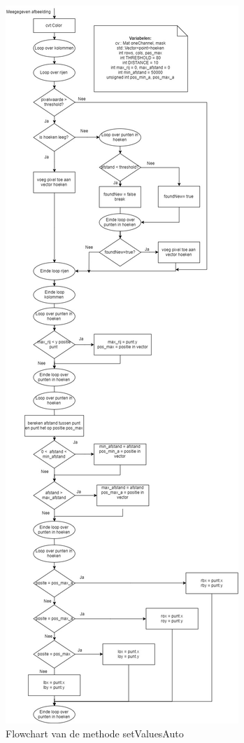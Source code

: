 \begin{figure}[hbp]
	\includegraphics[scale=0.34]{FlowChart_setValuesAuto}
	\caption{Flowchart van de methode setValuesAuto}
	\label{imgFCSVA}
\end{figure}
